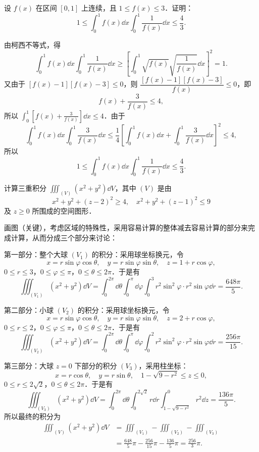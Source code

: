 设 $f(x)$ 在区间 $[0,1]$ 上连续，且 $1\le f(x)\le 3$．证明：
\[
1\le\int_{0}^{1}f(x)\dd x\int_{0}^{1}\frac{1}{f(x)}\dd x\le\frac{4}{3}.
\]
\begin{solution}
由柯西不等式，得
\[
\int_{0}^{1}f(x)\dd x\int_{0}^{1}\frac{1}{f(x)}\dd x
\ge\left[\int_{0}^{1}\sqrt{f(x)}\sqrt{\frac{1}{f(x)}}\dd x\right]^{2}=1.
\]
又由于 $\left[f(x)-1\right]\left[f(x)-3\right]\le 0$，则 $\dfrac{\left[f(x)-1\right]\left[f(x)-3\right]}{f(x)}\le 0$，即
\[
f(x)+\frac{3}{f(x)}\le 4,
\]
所以 $\displaystyle\int_{0}^{1}\left[f(x)+\frac{3}{f(x)}\right]\dd x\le 4$．由于
\[
\int_{0}^{1}f(x)\dd x\int_{0}^{1}\frac{3}{f(x)}\dd x
\le\frac{1}{4}\left[\int_{0}^{1}f(x)\dd x+\int_{0}^{1}\frac{3}{f(x)}\dd x\right]^{2}\le 4,
\]
所以
\[
1\le\int_{0}^{1}f(x)\dd x\int_{0}^{1}\frac{1}{f(x)}\dd x\le\frac{4}{3}.
\]
\end{solution}

计算三重积分 $\displaystyle\iiint_{(V)}\left(x^{2}+y^{2}\right)\dd V$，其中 $(V)$ 是由
\[
x^{2}+y^{2}+(z-2)^{2}\ge 4,\quad x^{2}+y^{2}+(z-1)^{2}\le 9
\]
及 $z\ge 0$ 所围成的空间图形．
\begin{solution}
画图（关键），考虑区域的特殊性，采用容易计算的整体减去容易计算的部分来完成计算，从而分成三个部分来讨论：

第一部分：整个大球 $(V_{1})$ 的积分：采用球坐标换元，令
\[
x=r\sin\varphi\cos\theta,\quad y=r\sin\varphi\sin\theta,\quad z=1+r\cos\varphi,
\]
$0\le r\le 3$，$0\le\varphi\le\pi$，$0\le\theta\le 2\pi$．于是有
\[
\iiint_{(V_{1})}\left(x^{2}+y^{2}\right)\dd V
=\int_{0}^{2\pi}\dd\theta\int_{0}^{\pi}\dd\varphi\int_{0}^{3}r^{2}\sin^{2}\varphi\cdot r^{2}\sin\varphi\dd r
=\frac{648\pi}{5}.
\]

第二部分：小球 $(V_{2})$ 的积分：采用球坐标换元，令
\[
x=r\sin\varphi\cos\theta,\quad y=r\sin\varphi\sin\theta,\quad z=2+r\cos\varphi,
\]
$0\le r\le 2$，$0\le\varphi\le\pi$，$0\le\theta\le 2\pi$．于是有
\[
\iiint_{(V_{2})}\left(x^{2}+y^{2}\right)\dd V
=\int_{0}^{2\pi}\dd\theta\int_{0}^{\pi}\dd\varphi\int_{0}^{2}r^{2}\sin^{2}\varphi\cdot r^{2}\sin\varphi\dd r
=\frac{256\pi}{15}.
\]

第三部分：大球 $z=0$ 下部分的积分 $(V_{3})$，采用柱坐标：
\[
x=r\cos\theta,\quad y=r\sin\theta,\quad 1-\sqrt{9-r^{2}}\le z\le 0,
\]
$0\le r\le 2\sqrt{2}$，$0\le\theta\le 2\pi$．于是有
\[
\iiint_{(V_{3})}\left(x^{2}+y^{2}\right)\dd V
=\int_{0}^{2\pi}\dd\theta\int_{0}^{2\sqrt{2}}r\dd r\int_{1-\sqrt{9-r^{2}}}^{0}r^{2}\dd z
=\frac{136\pi}{5}.
\]
所以最终的积分为
\begin{align*}
\iiint_{(V)}\left(x^{2}+y^{2}\right)\dd V
&=\iiint_{(V_{1})}-\iiint_{(V_{2})}-\iiint_{(V_{3})}\\
&=\frac{648}{5}\pi-\frac{256}{15}\pi-\frac{136}{5}\pi=\frac{256}{3}\pi.
\end{align*}
\end{solution}

